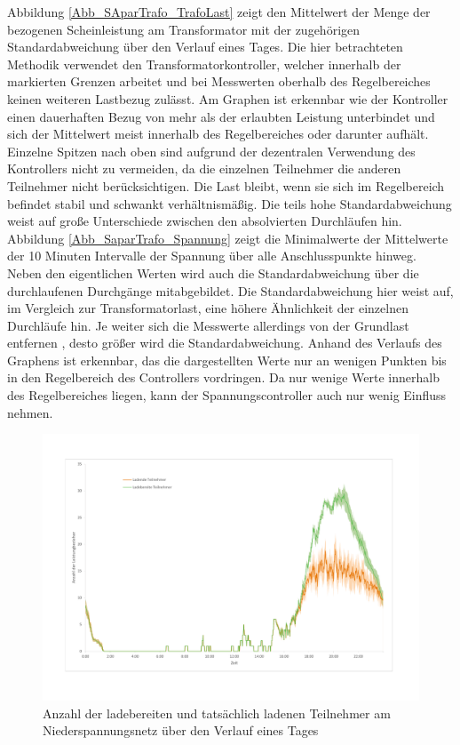 Abbildung \ref{Abb_SAparTrafo_TrafoLast} zeigt den Mittelwert der Menge der bezogenen Scheinleistung am Transformator mit der zugehörigen Standardabweichung über den Verlauf eines Tages. Die hier betrachteten Methodik verwendet den Transformatorkontroller, welcher innerhalb der markierten Grenzen arbeitet und bei Messwerten oberhalb des Regelbereiches keinen weiteren Lastbezug zulässt. Am Graphen ist erkennbar wie der Kontroller einen dauerhaften Bezug von mehr als der erlaubten Leistung unterbindet und sich der Mittelwert meist innerhalb des Regelbereiches oder darunter aufhält. Einzelne Spitzen nach oben sind aufgrund der dezentralen Verwendung des Kontrollers nicht zu vermeiden, da die einzelnen Teilnehmer die anderen Teilnehmer nicht berücksichtigen. Die Last bleibt, wenn sie sich im Regelbereich befindet stabil und schwankt verhältnismäßig. Die teils hohe Standardabweichung weist auf große Unterschiede zwischen den absolvierten Durchläufen hin.\\
Abbildung \ref{Abb_SaparTrafo_Spannung} zeigt die Minimalwerte der Mittelwerte der 10 Minuten Intervalle der Spannung über alle Anschlusspunkte hinweg. Neben den eigentlichen Werten wird auch die Standardabweichung über die durchlaufenen Durchgänge mitabgebildet. Die Standardabweichung hier weist auf, im Vergleich zur Transformatorlast, eine höhere Ähnlichkeit der einzelnen Durchläufe hin. Je weiter sich die Messwerte allerdings von der Grundlast entfernen , desto größer wird die Standardabweichung. Anhand des Verlaufs des Graphens ist erkennbar, das die dargestellten Werte nur an wenigen Punkten bis in den Regelbereich des Controllers vordringen. Da nur wenige Werte innerhalb des Regelbereiches liegen, kann der Spannungscontroller auch nur wenig Einfluss nehmen.\\
\begin{figure}[htb]
\centering
	\includegraphics[scale=0.5]{img/SA_par_trafo/Teilnehmer3.pdf}
	\caption{Anzahl der ladebereiten und tatsächlich ladenen Teilnehmer am Niederspannungsnetz über den Verlauf eines Tages}
	\label{Abb_SAparTrafo_Teilnehmer}
\end{figure}
